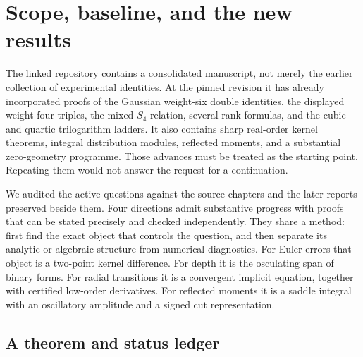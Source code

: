 \section{Scope, baseline, and the new results}
\label{sec:scope}

The linked repository contains a consolidated manuscript, not merely
the earlier collection of experimental identities. At the pinned
revision it has already incorporated proofs of the Gaussian weight-six
double identities, the displayed weight-four triples, the mixed $S_4$
relation, several rank formulas, and the cubic and quartic
trilogarithm ladders. It also contains sharp real-order kernel theorems,
integral distribution modules, reflected moments, and a substantial
zero-geometry programme. Those advances must be treated as the
starting point. Repeating them would not answer the request for a
continuation.

We audited the active questions against the source chapters and the
later reports preserved beside them. Four directions admit substantive
progress with proofs that can be stated precisely and checked
independently. They share a method: first find the exact object that
controls the question, and then separate its analytic or algebraic
structure from numerical diagnostics. For Euler errors that object is
a two-point kernel difference. For depth it is the osculating span of
binary forms. For radial transitions it is a convergent implicit
equation, together with certified low-order derivatives. For reflected
moments it is a saddle integral with an oscillatory amplitude and a
signed cut representation.

\subsection{A theorem and status ledger}


